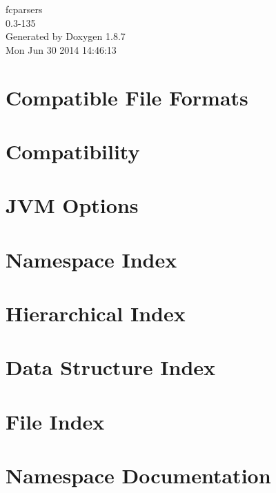 \documentclass[twoside]{book}
\newcommand{\+}{\discretionary{\mbox{\scriptsize$\hookleftarrow$}}{}{}}
\newcommand{\clearemptydoublepage}{%
  \newpage{\pagestyle{empty}\cleardoublepage}%
}
\begin{document}
\begin{titlepage}
\vspace*{7cm}
\begin{center}%
{\Large fcparsers \\[1ex]\large 0.\+3-\/135 }\\
\vspace*{1cm}
{\large Generated by Doxygen 1.8.7}\\
\vspace*{0.5cm}
{\small Mon Jun 30 2014 14:46:13}\\
\end{center}
\end{titlepage}
\clearemptydoublepage
\tableofcontents
\clearemptydoublepage
{}

\chapter{Compatible File Formats}
\label{formats}

\chapter{Compatibility}
\label{Compatibility}

\chapter{J\+V\+M Options}
\label{jvmopt}

\chapter{Namespace Index}

\chapter{Hierarchical Index}

\chapter{Data Structure Index}

\chapter{File Index}

\chapter{Namespace Documentation}














\end{document}
